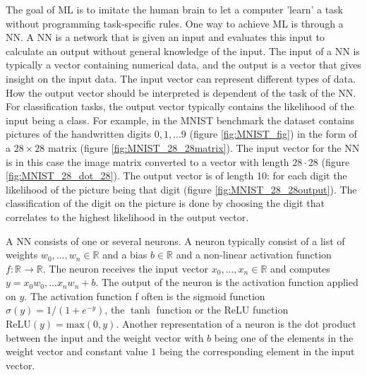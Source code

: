 \documentclass[../thesis.tex]{subfiles}
\begin{document}
The goal of ML is to imitate the human brain to let a computer 'learn' a task without programming task-specific rules. One way to achieve ML is through a NN. A NN is a network that is given an input and evaluates this input to calculate an output without general knowledge of the input. The input of a NN is typically a vector containing numerical data, and the output is a vector that gives insight on the input data. The input vector can represent different types of data. How the output vector should be interpreted is dependent of the task of the NN. For classification tasks, the output vector typically contains the likelihood of the input being a class. For example, in the MNIST benchmark \parencite{lecun1998} the dataset contains pictures of the handwritten digits $0, 1, ... 9$ (figure \ref{fig:MNIST_fig}) in the form of a $28 \times 28$ matrix (figure \ref{fig:MNIST_28_28matrix}). The input vector for the NN is in this case the image matrix converted to a vector with length $28 \cdot 28$ (figure \ref{fig:MNIST_28_dot_28}). The output vector is of length 10: for each digit the likelihood of the picture being that digit (figure \ref{fig:MNIST_28_28output}). The classification of the digit on the picture is done by choosing the digit that correlates to the highest likelihood in the output vector.

A NN consists of one or several neurons. A neuron typically consist of a list of weights $w_0, ..., w_n \in \mathbb{R}$ and a bias $b \in \mathbb{R}$ and a non-linear activation function $f: \mathbb{R} \to \mathbb{R}$. The neuron receives the input vector $x_0, ..., x_n \in \mathbb{R}$ and computes $y = x_0w_0, ... x_nw_n + b$. The output of the neuron is the activation function applied on $y$. The activation function f often is the sigmoid function $\sigma (y) = 1/(1+e^{-y})$, the $\tanh$ function or the ReLU function $\textrm{ReLU}(y) = \textrm{max}(0,y)$. Another representation of a neuron is the dot product between the input and the weight vector with $b$ being one of the elements in the weight vector and constant value $1$ being the corresponding element in the input vector. 
\end{document}
